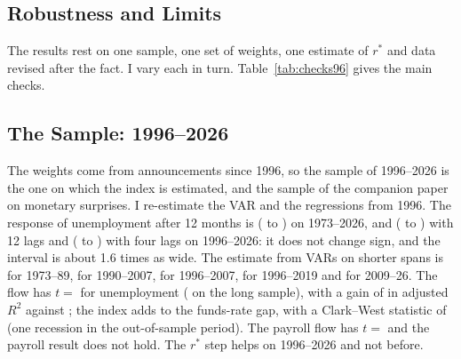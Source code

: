 \documentclass[11pt]{article}
\newcommand{\rs}{r^{*}}
\begin{document}
\begin{appendices}

\section{Robustness and Limits}\label{sec:rob}\label{app:robust}
The results rest on one sample, one set of weights, one estimate of $\rs$ and data revised after the fact. I vary each in turn. Table~\ref{tab:checks96} gives the main checks.

\subsection{The Sample: 1996--2026}\label{sec:sample96}
The weights come from announcements since 1996, so the sample of 1996--2026 is the one on which the index is estimated, and the sample of the companion paper on monetary surprises. I re-estimate the VAR and the regressions from 1996. The response of unemployment after 12 months is  ( to ) on 1973--2026, and  ( to ) with 12 lags and  ( to ) with four lags on 1996--2026: it does not change sign, and the interval is about 1.6 times as wide. The estimate from VARs on shorter spans is  for 1973--89,  for 1990--2007,  for 1996--2007,  for 1996--2019 and  for 2009--26. The flow has $t=$  for unemployment ( on the long sample), with a gain of  in adjusted $R^2$ against ; the index adds  to the funds-rate gap, with a Clark--West statistic of  (one recession in the out-of-sample period). The payroll flow has $t=$  and the payroll result does not hold. The $\rs$ step helps on 1996--2026 and not before.




\end{appendices}
\end{document}
